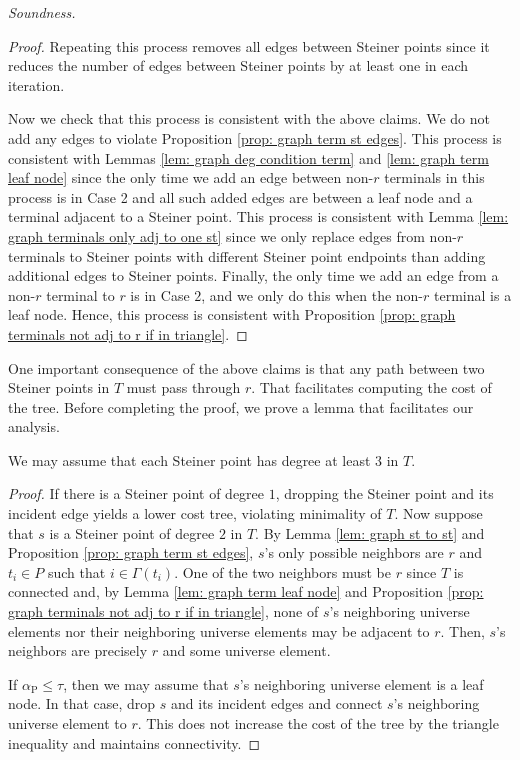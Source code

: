\documentclass{theoretics}
\newcommand{\1}{\textbf{1}}
\newcommand{\td}{\tau}
\newcommand{\trd}{\alpha_{\text{P}}}
\begin{document}
\begin{paragraph}{\textit{Soundness.}}
\begin{proof}
  Repeating this process removes all edges between Steiner points since it reduces the number of edges between Steiner points by at least one in each iteration. 
  
  Now we check that this process is consistent with the above claims. We do not add any edges to violate Proposition \ref{prop: graph term st edges}.  This process is consistent with Lemmas \ref{lem: graph deg condition term} and \ref{lem: graph term leaf node}  since the only time we add an edge between non-$r$ terminals in this process is in Case 2 and all such added edges are between a leaf node and a terminal adjacent to a Steiner point. This process is consistent with Lemma \ref{lem: graph terminals only adj to one st} since we only replace edges from non-$r$ terminals to Steiner points with different Steiner point endpoints than adding additional edges to Steiner points. Finally, the only time we add an edge from a non-$r$ terminal to $r$ is in Case $2$, and we only do this when the non-$r$ terminal is a leaf node. Hence, this process is consistent with Proposition \ref{prop: graph terminals not adj to r if in triangle}.
 \end{proof}
 
One important consequence of the above claims is that any path between two Steiner points in $T$ must pass through $r$. That facilitates computing the cost of the tree. Before completing the proof, we prove a lemma that facilitates our analysis. 

\begin{lemma} \label{lem: graph st deg at least 3}
We may assume that each Steiner point has degree at least $3$ in $T$.
\end{lemma}
\begin{proof}
 If there is a Steiner point of degree $1$, dropping the Steiner point and its incident edge yields a lower cost tree, violating minimality of $T$. Now suppose that $s$ is a Steiner point of degree $2$ in $T$. By Lemma \ref{lem: graph st to st} and Proposition \ref{prop: graph term st edges}, $s$'s only possible neighbors are $r$ and $t_i \in P$ such that $i \in \Gamma(t_i)$. One of the two neighbors must be $r$ since $T$ is connected and, by Lemma \ref{lem: graph term leaf node} and Proposition \ref{prop: graph terminals not adj to r if in triangle}, none of $s$'s neighboring universe elements nor their neighboring universe elements may be adjacent to $r$. Then, $s$'s neighbors are precisely $r$ and some universe element. 

If $\trd \leq \td$, then we may assume that $s$'s neighboring universe element is a leaf node. In that case, drop $s$ and its incident edges and connect $s$'s neighboring universe element to $r$. This does not increase the cost of the tree by the triangle inequality and maintains connectivity.


\end{proof}
\end{paragraph}
\end{document}

